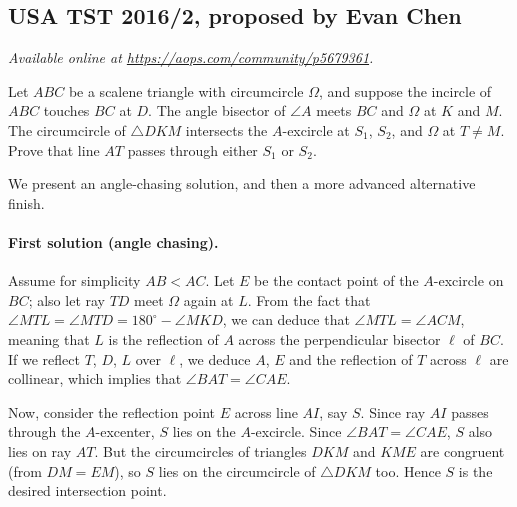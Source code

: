 \documentclass[11pt]{scrartcl}
\begin{document}
\subsection{USA TST 2016/2, proposed by Evan Chen}
\textsl{Available online at \url{https://aops.com/community/p5679361}.}
\begin{mdframed}[style=mdpurplebox,frametitle={Problem statement}]
Let $ABC$ be a scalene triangle with circumcircle $\Omega$,
and suppose the incircle of $ABC$ touches $BC$ at $D$.
The angle bisector of $\angle A$ meets $BC$ and $\Omega$ at $K$ and $M$.
The circumcircle of $\triangle DKM$ intersects the $A$-excircle
at $S_1$, $S_2$, and $\Omega$ at $T \neq M$.
Prove that line $AT$ passes through either $S_1$ or $S_2$.
\end{mdframed}
We present an angle-chasing solution,
and then a more advanced alternative finish.

\paragraph{First solution (angle chasing).}
Assume for simplicity $AB < AC$.
Let $E$ be the contact point of the $A$-excircle on $BC$;
also let ray $TD$ meet $\Omega$ again at $L$.
From the fact that $\angle MTL = \angle MTD = 180^{\circ} - \angle MKD$,
we can deduce that $\angle MTL = \angle ACM$,
meaning that $L$ is the reflection of $A$ across the
perpendicular bisector $\ell$ of $BC$.
If we reflect $T$, $D$, $L$ over $\ell$, we deduce $A$, $E$ and the reflection of $T$ across
$\ell$ are collinear, which implies that $\angle BAT = \angle CAE$.

Now, consider the reflection point $E$ across line $AI$, say $S$.
Since ray $AI$ passes through the $A$-excenter, $S$ lies on the $A$-excircle.
Since $\angle BAT = \angle CAE$, $S$ also lies on ray $AT$.
But the circumcircles of triangles $DKM$ and $KME$ are congruent (from $DM = EM$),
so $S$ lies on the circumcircle of $\triangle DKM$ too.
Hence $S$ is the desired intersection point.
\end{document}
